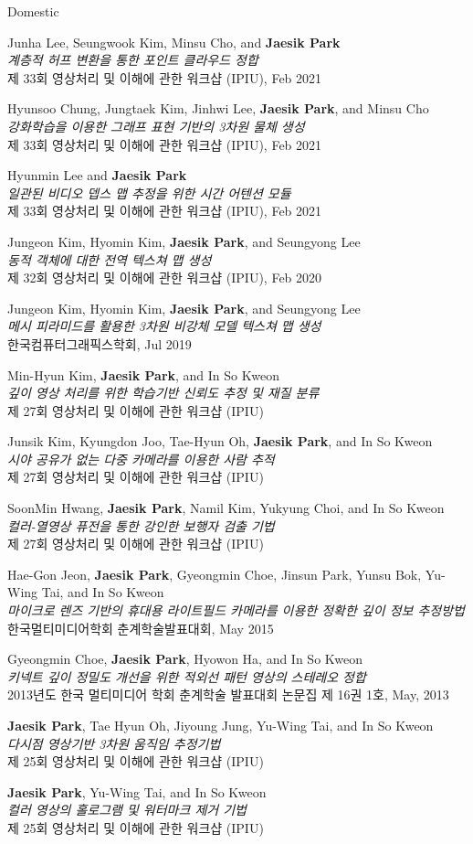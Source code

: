 \documentclass[letterpaper,11pt]{article}
\newcommand{\publicationItem}[3]{
  \small{
  \item{#1\\ \emph{#2}\\ #3\vspace{-2pt}}
  }
}
\newcommand{\resumePublicationListStart}{\begin{enumerate}[leftmargin=0.5in, label={[\arabic*]}]}
\newcommand{\resumePublicationListEnd}{\end{enumerate}\vspace{-5pt}}
\begin{document}
Domestic
\resumePublicationListStart
    \publicationItem{Junha Lee, Seungwook Kim, Minsu Cho, and \textbf{Jaesik Park}}{계층적 허프 변환을 통한 포인트 클라우드 정합}{제 33회 영상처리 및 이해에 관한 워크샵 (IPIU), Feb 2021}
    \publicationItem{Hyunsoo Chung, Jungtaek Kim, Jinhwi Lee, \textbf{Jaesik Park}, and Minsu Cho}{강화학습을 이용한 그래프 표현 기반의 3차원 물체 생성}{제 33회 영상처리 및 이해에 관한 워크샵 (IPIU), Feb 2021}
    \publicationItem{Hyunmin Lee and \textbf{Jaesik Park}}{일관된 비디오 뎁스 맵 추정을 위한 시간 어텐션 모듈}{제 33회 영상처리 및 이해에 관한 워크샵 (IPIU), Feb 2021}
    \publicationItem{Jungeon Kim, Hyomin Kim, \textbf{Jaesik Park}, and Seungyong Lee}{동적 객체에 대한 전역 텍스쳐 맵 생성}{제 32회 영상처리 및 이해에 관한 워크샵 (IPIU), Feb 2020}
    \publicationItem{Jungeon Kim, Hyomin Kim, \textbf{Jaesik Park}, and Seungyong Lee}{메시 피라미드를 활용한 3차원 비강체 모델 텍스쳐 맵 생성}{한국컴퓨터그래픽스학회, Jul 2019}
    \publicationItem{Min-Hyun Kim, \textbf{Jaesik Park}, and In So Kweon}{깊이 영상 처리를 위한 학습기반 신뢰도 추정 및 재질 분류}{제 27회 영상처리 및 이해에 관한 워크샵 (IPIU)}
    \publicationItem{Junsik Kim, Kyungdon Joo, Tae-Hyun Oh, \textbf{Jaesik Park}, and In So Kweon}{시야 공유가 없는 다중 카메라를 이용한 사람 추적}{제 27회 영상처리 및 이해에 관한 워크샵 (IPIU)}
    \publicationItem{SoonMin Hwang, \textbf{Jaesik Park}, Namil Kim, Yukyung Choi, and In So Kweon}{컬러-열영상 퓨전을 통한 강인한 보행자 검출 기법}{제 27회 영상처리 및 이해에 관한 워크샵 (IPIU)}
    \publicationItem{Hae-Gon Jeon, \textbf{Jaesik Park}, Gyeongmin Choe, Jinsun Park, Yunsu Bok, Yu-Wing Tai, and In So Kweon}{마이크로 렌즈 기반의 휴대용 라이트필드 카메라를 이용한 정확한 깊이 정보 추정방법}{한국멀티미디어학회 춘계학술발표대회, May 2015}
    \publicationItem{Gyeongmin Choe, \textbf{Jaesik Park}, Hyowon Ha, and In So Kweon}{키넥트 깊이 정밀도 개선을 위한 적외선 패턴 영상의 스테레오 정합}{2013년도 한국 멀티미디어 학회 춘계학술 발표대회 논문집 제 16권 1호, May, 2013}
    \publicationItem{\textbf{Jaesik Park}, Tae Hyun Oh, Jiyoung Jung, Yu-Wing Tai, and In So Kweon}{다시점 영상기반 3차원 움직임 추정기법}{제 25회 영상처리 및 이해에 관한 워크샵 (IPIU)}
    \publicationItem{\textbf{Jaesik Park}, Yu-Wing Tai, and In So Kweon}{컬러 영상의 홀로그램 및 워터마크 제거 기법}{제 25회 영상처리 및 이해에 관한 워크샵 (IPIU)}
\resumePublicationListEnd
\end{document}
